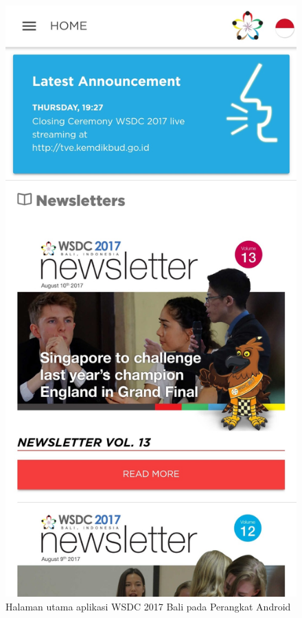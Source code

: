\begin{figure}[H]
    \centering
    \includegraphics[scale=0.12]{Gambar/WSDC2017-App.jpg}
    \caption{Halaman utama aplikasi WSDC 2017 Bali pada Perangkat Android}
    \label{fig:wsdcapp}
\end{figure}


